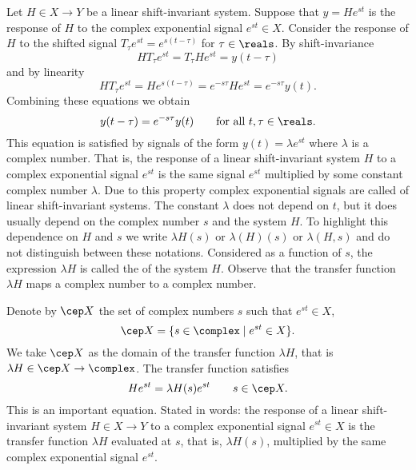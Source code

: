 Let $H \in X \to Y$ be a linear shift-invariant system.  Suppose that $y = H e^{st}$ is the response of $H$ to the complex exponential signal $e^{st} \in X$.  Consider the response of $H$ to the shifted signal $T_\tau e^{st} = e^{s(t-\tau)}$ for $\tau \in \reals$.  By shift-invariance
\[
H T_{\tau} e^{st} = T_{\tau} H  e^{st} = y(t - \tau) %
\]
and by linearity
\[
H T_\tau e^{st} = H e^{s(t-\tau)} = e^{-s\tau} H e^{st}  = e^{-s\tau} y(t). %
\]
Combining these equations we obtain
\[
y(t - \tau) = e^{-s\tau} y(t) \qquad \text{for all $t,\tau \in \reals$}.
\]
This equation is satisfied by signals of the form $y(t) = \lambda e^{st}$ where $\lambda$ is a complex number.  That is, the response of a linear shift-invariant system $H$ to a complex exponential signal $e^{st}$ is the same signal $e^{st}$ multiplied by some constant complex number $\lambda$.  Due to this property complex exponential signals are called  of linear shift-invariant systems.  The constant $\lambda$ does not depend on $t$, but it does usually depend on the complex number $s$ and the system $H$.  To highlight this dependence on $H$ and $s$ we write $\lambda H(s)$ or $\lambda(H)(s)$ or $\lambda(H,s)$ and do not distinguish between these notations.  Considered as a function of $s$, the expression $\lambda H$ is called the  of the system $H$.  Observe that the transfer function $\lambda H$ maps a complex number to a complex number.

Denote by $\cep X$ the set of complex numbers $s$ such that $e^{st} \in X$,
\[
\cep X = \{ s \in \complex \mid e^{st} \in X \}.
\]
We take $\cep X$ as the domain of the transfer function $\lambda H$, that is $\lambda H \in \cep X \to \complex$.  The transfer function satisfies
\begin{equation}\label{eq:transfuneigenproperty}
H e^{st} = \lambda H(s) e^{st} \qquad s \in \cep X.
\end{equation}
This is an important equation.  Stated in words: the response of a linear shift-invariant system $H \in X \to Y$ to a complex exponential signal $e^{st} \in X$ is the transfer function $\lambda H$ evaluated at $s$, that is, $\lambda H(s)$,  multiplied by the same complex exponential signal $e^{st}$.

